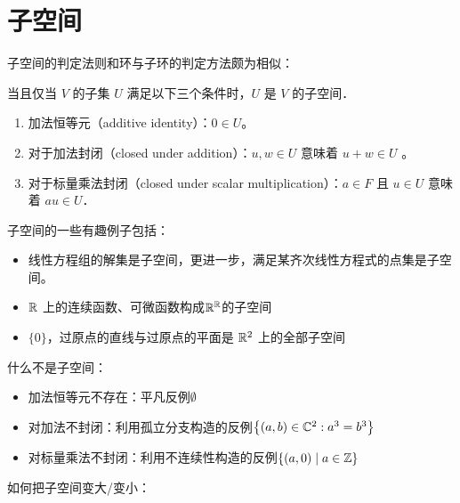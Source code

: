 \section{子空间}
子空间的判定法则和环与子环的判定方法颇为相似：
\begin{theorem}[子空间的条件]
    当且仅当 \(V\) 的子集 \(U\) 满足以下三个条件时，\(U\) 是 \(V\) 的子空间．
    \begin{enumerate}
        \item 加法恒等元（additive identity）：\(0 \in U\)。
        \item 对于加法封闭（closed under addition）：\(u, w \in U\)
            意味着 \(u + w \in U\) 。
        \item 对于标量乘法封闭（closed under scalar
            multiplication）：\(a \in F\)  且 \(u \in U\) 意味着
            \(au \in U\)．
    \end{enumerate}
\end{theorem}
子空间的一些有趣例子包括：
\begin{itemize}
    \item 线性方程组的解集是子空间，更进一步，满足某齐次线性方程式的点集是子空间。
    \item \(\mathbb{R}\)
        上的连续函数、可微函数构成\(\mathbb{R}^{\mathbb{R}}\)的子空间
    \item \(\{0\}\)，过原点的直线与过原点的平面是 \(\mathbb{R}^{2}\) 上的全部子空间
\end{itemize}
什么不是子空间：
\begin{itemize}\label{item:subspace counterexample}
    \item 加法恒等元不存在：平凡反例\(\emptyset\)
    \item 对加法不封闭：利用孤立分支构造的反例\(\left\{ (a,b)\in
        \mathbb{C}^{2}: a^{3}=b^{3}\right\}\)
    \item 对标量乘法不封闭：利用不连续性构造的反例\(\left\{(a,0)\mid a\in
        \mathbb{Z}\right\}\)
\end{itemize}

如何把子空间变大/变小：
